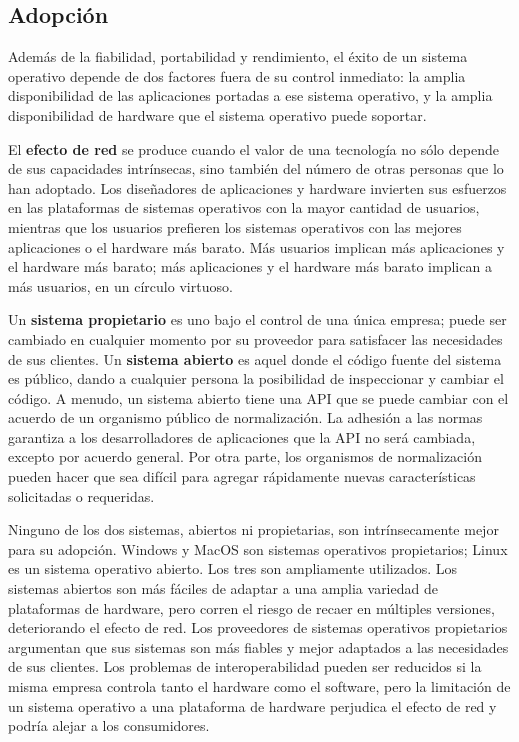 \documentclass[10pt]{book}
\begin{document}
\subsection{Adopción}
Además de la fiabilidad, portabilidad y rendimiento, el éxito de un sistema operativo depende de dos factores fuera de su control inmediato: la amplia disponibilidad de las aplicaciones portadas a ese sistema operativo, y la amplia disponibilidad de hardware que el sistema operativo puede soportar.

El \textbf{efecto de red} se produce cuando el valor de una tecnología no sólo depende de sus capacidades intrínsecas, sino también del número de otras personas que lo han adoptado. Los diseñadores de aplicaciones y hardware invierten sus esfuerzos en las plataformas de sistemas operativos con la mayor cantidad de usuarios, mientras que los usuarios prefieren los sistemas operativos con las mejores aplicaciones o el hardware más barato. Más usuarios implican más aplicaciones y el hardware más barato; más aplicaciones y el hardware más barato implican a más usuarios, en un círculo virtuoso.

Un \textbf{sistema propietario} es uno bajo el control de una única empresa; puede ser cambiado en cualquier momento por su proveedor para satisfacer las necesidades de sus clientes. Un \textbf{sistema abierto} es aquel donde el código fuente del sistema es público, dando a cualquier persona la posibilidad de inspeccionar y cambiar el código. A menudo, un sistema abierto tiene una API que se puede cambiar con el acuerdo de un organismo público de normalización. La adhesión a las normas garantiza a los desarrolladores de aplicaciones que la API no será cambiada, excepto por acuerdo general. Por otra parte, los organismos de normalización pueden hacer que sea difícil para agregar rápidamente nuevas características solicitadas o requeridas. 

Ninguno de los dos sistemas, abiertos ni propietarias, son intrínsecamente mejor para su adopción. Windows y MacOS son sistemas operativos propietarios; Linux es un sistema operativo abierto. Los tres son ampliamente utilizados. Los sistemas abiertos son más fáciles de adaptar a una amplia variedad de plataformas de hardware, pero corren el riesgo de recaer en múltiples versiones, deteriorando el efecto de red. Los proveedores de sistemas operativos propietarios argumentan que sus sistemas son más fiables y mejor adaptados a las necesidades de sus clientes. Los problemas de interoperabilidad pueden ser reducidos si la misma empresa controla tanto el hardware como el software, pero la limitación de un sistema operativo a una plataforma de hardware perjudica el efecto de red y podría alejar a los consumidores.
\end{document}
